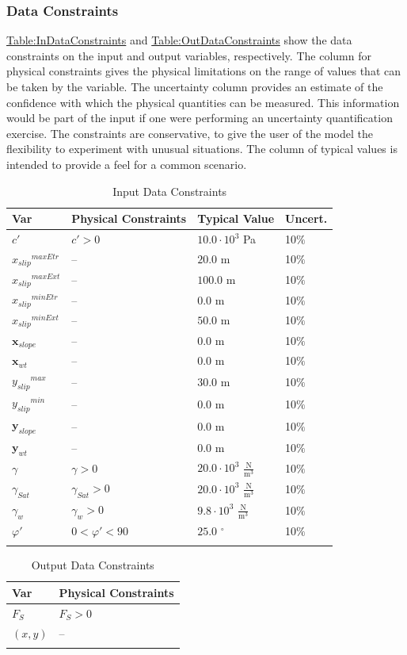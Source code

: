\documentclass[12pt]{article}
\begin{document}
\subsubsection{Data Constraints}
\label{Sec:DataConstraints}
\hyperref[Table:InDataConstraints]{Table:InDataConstraints} and \hyperref[Table:OutDataConstraints]{Table:OutDataConstraints} show the data constraints on the input and output variables, respectively. The column for physical constraints gives the physical limitations on the range of values that can be taken by the variable. The uncertainty column provides an estimate of the confidence with which the physical quantities can be measured. This information would be part of the input if one were performing an uncertainty quantification exercise. The constraints are conservative, to give the user of the model the flexibility to experiment with unusual situations. The column of typical values is intended to provide a feel for a common scenario.
\begin{longtable}{l l l l}
\toprule
Var & Physical Constraints & Typical Value & Uncert.
\\
\midrule
\endhead
$c'$ & $c'>0$ & $10.0\cdot{}10^{3}$ Pa & 10$\%$
\\
${{x_{slip}}^{maxEtr}}$ & -- & $20.0$ m & 10$\%$
\\
${{x_{slip}}^{maxExt}}$ & -- & $100.0$ m & 10$\%$
\\
${{x_{slip}}^{minEtr}}$ & -- & $0.0$ m & 10$\%$
\\
${{x_{slip}}^{minExt}}$ & -- & $50.0$ m & 10$\%$
\\
${\mathbf{x}_{slope}}$ & -- & $0.0$ m & 10$\%$
\\
${\mathbf{x}_{wt}}$ & -- & $0.0$ m & 10$\%$
\\
${{y_{slip}}^{max}}$ & -- & $30.0$ m & 10$\%$
\\
${{y_{slip}}^{min}}$ & -- & $0.0$ m & 10$\%$
\\
${\mathbf{y}_{slope}}$ & -- & $0.0$ m & 10$\%$
\\
${\mathbf{y}_{wt}}$ & -- & $0.0$ m & 10$\%$
\\
$γ$ & $γ>0$ & $20.0\cdot{}10^{3}$ $\frac{\text{N}}{\text{m}^{3}}$ & 10$\%$
\\
${γ_{Sat}}$ & ${γ_{Sat}}>0$ & $20.0\cdot{}10^{3}$ $\frac{\text{N}}{\text{m}^{3}}$ & 10$\%$
\\
${γ_{w}}$ & ${γ_{w}}>0$ & $9.8\cdot{}10^{3}$ $\frac{\text{N}}{\text{m}^{3}}$ & 10$\%$
\\
$φ'$ & $0<φ'<90$ & $25.0$ ${}^{\circ}$ & 10$\%$
\\
\bottomrule
\caption{Input Data Constraints}
\label{Table:InDataConstraints}
\end{longtable}
\begin{longtable}{l l}
\toprule
Var & Physical Constraints
\\
\midrule
\endhead
${F_{S}}$ & ${F_{S}}>0$
\\
$(x,y)$ & --
\\
\bottomrule
\caption{Output Data Constraints}
\label{Table:OutDataConstraints}
\end{longtable}
\end{document}
